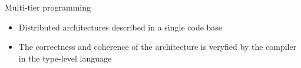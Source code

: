 \begin{frame}{Multi-tier programming~\cite{DBLP:journals/csur/WeisenburgerWS20}}
  \begin{cardTiny}
    \begin{itemize}
      \item Distributed architectures  described in a single code base
      \item[\success{\faThumbsUp}] The correctness and coherence of the architecture is veryfied by the compiler in the type-level language 
    \end{itemize}
  \end{cardTiny}
  \centering
\end{frame}